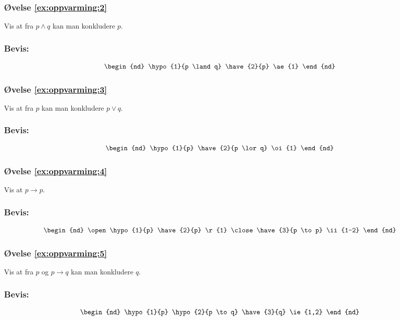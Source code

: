\documentclass[../main.tex]{subfiles}
\begin{document}
\bigskip
\subsubsection{Øvelse \ref{ex:oppvarming:2}} \label{ex:oppvarming:2:solution}
Vis at fra \(p \land q\) kan man konkludere \(p\).

\subsubsection*{Bevis:}
\[
\begin{nd}
  \hypo{1}{p \land q}
  \have{2}{p} \ae{1}
\end{nd}
\]


\bigskip
\subsubsection{Øvelse \ref{ex:oppvarming:3}} \label{ex:oppvarming:3:solution}
Vis at fra \(p\) kan man konkludere \(p \lor q\).

\subsubsection*{Bevis:}
\[
\begin{nd}
  \hypo{1}{p}
  \have{2}{p \lor q} \oi{1}
\end{nd}
\]


\bigskip
\subsubsection{Øvelse \ref{ex:oppvarming:4}} \label{ex:oppvarming:4:solution}
Vis at \(p \to p\).

\subsubsection*{Bevis:}
\[
\begin{nd}
  \open
    \hypo{1}{p}
    \have{2}{p} \r{1}
  \close
  \have{3}{p \to p} \ii{1-2}
\end{nd}
\]


\bigskip
\subsubsection{Øvelse \ref{ex:oppvarming:5}} \label{ex:oppvarming:5:solution}
Vis at fra \(p\) og \(p \to q\) kan man konkludere \(q\).

\subsubsection*{Bevis:}
\[
\begin{nd}
  \hypo{1}{p}
  \hypo{2}{p \to q}
  \have{3}{q} \ie{1,2}
\end{nd}
\]
\end{document}
